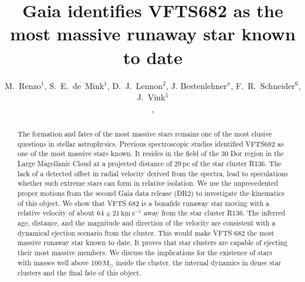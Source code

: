 \documentclass[apjl,twocolumn]{emulateapj}
\newcommand{\todo}[1]{{\large $\blacksquare$~\textbf{\color{red}[#1]}}~$\blacksquare$}
\newcommand{\SdM}[1]{{{\color{brown}{#1}}}}
\newcommand{\kms}{{\,\mathrm{km\ s^{-1}}}}
\newcommand{\Msun}{{\,\mathrm{M}_\odot}}
\begin{document}
\title{Gaia identifies VFTS682 as the most massive %
  runaway star known to date}

\author{M.~Renzo$^{1}$, S.~E.~de~Mink$^{1}$, D.~J.~Lennon$^{2}$, J. Bestenlehner$^{x}$,  F.~R.~Schneider$^6$, J.~Vink$^{5}$ \SdM{et al.?} \\ \SdM{[ Alphabetical after Lennon. Possibly add further last-minute coauthors]},  }
  

  
\date{}
\begin{abstract}
The formation and fates of the most massive stars remains one of the most elusive questions in stellar astrophysics. 
%
Previous spectroscopic studies identified VFTS682 as one of the most massive stars known. It resides in the field of the 30 Dor region in the Large Magellanic Cloud at a projected distance of 29\,pc of the star cluster R136. The lack of a detected offset in radial velocity derived from the spectra, lead to speculations whether such extreme stars can form in relative isolation. 
%
We use the unprecedented proper motions from the second Gaia data
release (DR2) to investigate the kinematics of this object. We show
that VFTS 682 is a bonafide runaway star moving with a relative
velocity of about $64\pm21\kms$ away from the star cluster R136.  The
inferred age, distance, and the magnitude and direction of the
velocity are consistent with a dynamical ejection scenario from the cluster. 
%
This would make VFTS 682 the most massive runaway star known to date.  It proves that star clusters are capable of ejecting their most massive members. We discuss the implications for the existence of stars with masses well above $100\Msun$ inside the cluster, the internal dynamics in dense star clusters and the final fate of this object. 

\end{abstract}
\end{document}
